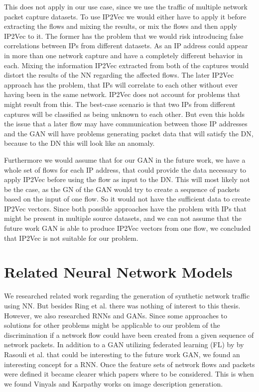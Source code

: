 \documentclass[
	ngerman,
	ruledheaders=section,%
	class=report,%
	thesis={type=bachelor},%
	accentcolor=9c,%
	custommargins=true,%
	marginpar=false,%
	parskip=half-,%
	fontsize=11pt,%
]{tudapub}
\begin{document}
This does not apply in our use case, since we use the traffic of multiple network packet capture datasets.
To use IP2Vec we would either have to apply it before extracting the flows and mixing the results,
or mix the flows and then apply IP2Vec to it.
The former has the problem that we would risk introducing false correlations between IPs from different datasets.
As an IP address could appear in more than one network capture and have a completely different behavior in each.
Mixing the information IP2Vec extracted from both of the captures would distort the results of the NN regarding the affected flows.
The later IP2Vec approach has the problem, that IPs will correlate to each other without ever having been in the same network.
IP2Vec does not account for problems that might result from this.
The best-case scenario is that two IPs from different captures will be classified as being unknown to each other.
But even this holds the issue that a later flow may have communication between those IP addresses and the GAN will have problems generating packet data that will satisfy the DN, because to the DN this will look like an anomaly.

Furthermore we would assume that for our GAN in the future work, we have a whole set of flows for each IP address, that could provide the data necessary to apply IP2Vec before using the flow as input to the DN.
This will most likely not be the case, as the GN of the GAN would try to create a sequence of packets based on the input of one flow.
So it would not have the sufficient data to create IP2Vec vectors.
Since both possible approaches have the problem with IPs that might be present in multiple source datasets,
and we can not assume that the future work GAN is able to produce IP2Vec vectors from one flow,
we concluded that IP2Vec is not suitable for our problem.

\section{Related Neural Network Models}
\label{sec:relatedNNmodels}

We researched related work regarding the generation of synthetic network traffic using NN.
But besides Ring et al. there was nothing of interest to this thesis.
However, we also researched RNNs and GANs.
Since some approaches to solutions for other problems might be applicable to our problem of
the discrimination if a network flow could have been created from a given sequence of network packets.
In addition to a GAN utilizing federated learning (FL) by by Rasouli et al. \cite{rasouliFedGANFederatedGenerative2020} that could be interesting to the future work GAN, we found an interesting concept for a RNN.
Once the feature sets of network flows and packets were defined it became clearer which papers where to be considered.
This is when we found Vinyals \cite{vinyalsShowTellNeural2015} and Karpathy \cite{karpathyDeepVisualSemanticAlignments2015} works on image description generation.
\end{document}
